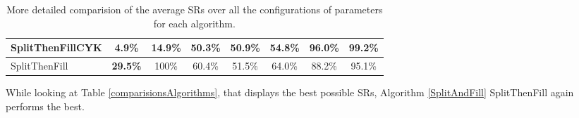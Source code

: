 \begin{table}[h]
\begin{adjustbox}{max width=\textwidth}
\begin{tabular}{|l|c|c|c|c|c|c|c|}
		SplitThenFillCYK                   &\textbf{4.9\%}    &14.9\%                                                           &50.3\%                                                              &50.9\%      &54.8\%                                                        &96.0\%                                                         &99.2\%                                                           \\ \hline
		SplitThenFill                    &\textbf{29.5\%}      &100\%                                                           &60.4\%                                                              &51.5\%      &64.0\%                                                        &88.2\%                                                         &95.1\%                                                           \\ \hline
	\end{tabular}
\end{adjustbox}
	\caption{More detailed comparision of the average SRs over all the configurations of parameters for each algorithm.}
	\label{comparisionsAlgorithmsMean}
\end{table}
\noindent While looking at Table \ref{comparisionsAlgorithms}, that displays the best possible SRs, Algorithm \ref{SplitAndFill} SplitThenFill again performs the best.\\
 
